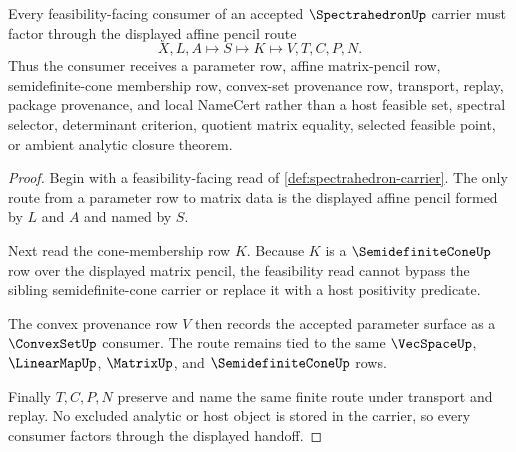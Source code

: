 \begin{theorem}
\label{thm:spectrahedron-semidefinite-cone-handoff}
Every feasibility-facing consumer of an accepted $\SpectrahedronUp$ carrier must factor through the displayed affine pencil route
$$
X,L,A \longmapsto S \longmapsto K \longmapsto V,T,C,P,N .
$$
Thus the consumer receives a parameter row, affine matrix-pencil row, semidefinite-cone membership row, convex-set provenance row, transport, replay, package provenance, and local NameCert rather than a host feasible set, spectral selector, determinant criterion, quotient matrix equality, selected feasible point, or ambient analytic closure theorem.
\end{theorem}
\begin{proof}
Begin with a feasibility-facing read of \autoref{def:spectrahedron-carrier}. The only route from a parameter row to matrix data is the displayed affine pencil formed by $L$ and $A$ and named by $S$.

Next read the cone-membership row $K$. Because $K$ is a $\SemidefiniteConeUp$ row over the displayed matrix pencil, the feasibility read cannot bypass the sibling semidefinite-cone carrier or replace it with a host positivity predicate.

The convex provenance row $V$ then records the accepted parameter surface as a $\ConvexSetUp$ consumer. The route remains tied to the same $\VecSpaceUp$, $\LinearMapUp$, $\MatrixUp$, and $\SemidefiniteConeUp$ rows.

Finally $T,C,P,N$ preserve and name the same finite route under transport and replay. No excluded analytic or host object is stored in the carrier, so every consumer factors through the displayed handoff.
\end{proof}

